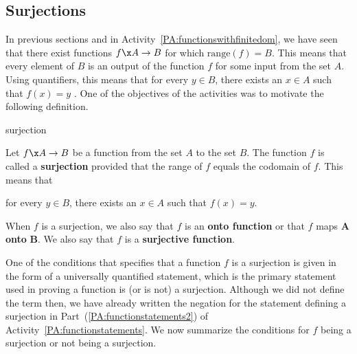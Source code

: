 \subsection*{Surjections}
In previous sections and in \typeu Activity~\ref*{PA:functionswithfinitedom}, we have seen that there exist functions  $f\x A \to B$ for which $\text{range}(f) = B$.  This means that every element of $B$ is an output of the function $f$ for some input from the set $A$.  Using quantifiers, this means that for every $y \in B$, there exists an $x \in A$ such that $f( x ) = y$ . One of the objectives of the \typel activities was to motivate the following definition.  

%
\begin{defbox}{surjection}{Let  $f\x A \to B$  be a function from the set  $A$  to the set  $B$.  The function  $f$  is called a \textbf{surjection}
%
  provided that the range of  $f$   equals the codomain of  $f$.  This means that
\begin{center}
for every  $y \in B$, there exists an  $x \in A$  such that  $f( x ) = y$.
\end{center}
When  $f$  is a surjection, we also say that  $f$  is an \textbf{onto function}
%
%
 or that  $f$  maps  $\boldsymbol{A}$  \textbf{onto}  $\boldsymbol{B}$\!.  We also say that  $f$  is a \textbf{surjective function}.}
%
\end{defbox}
%
One of the conditions that specifies that a function  $f$  is a surjection is given in the form of a universally quantified statement, which is the primary statement used in proving a function is (or is not) a surjection.  Although we did not define the term then, we have already written the negation for the statement defining a surjection in Part~(\ref{PA:functionstatements2}) of \typeu Activity~\ref*{PA:functionstatements}.  We now summarize the conditions for  $f$  being a surjection or not being a surjection.
%
